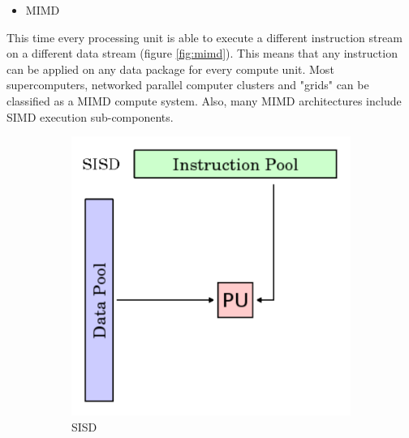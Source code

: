 \documentclass[a4paper, 11pt]{report}
\begin{document}
	\begin{itemize}
		\item MIMD
	\end{itemize}
This time every processing unit is able to execute a different instruction stream on a different data stream (figure \ref{fig:mimd}). This means that any instruction can be applied on any data package for every compute unit. Most supercomputers, networked parallel computer clusters and "grids" can be classified as a MIMD compute system. Also, many MIMD architectures include SIMD execution sub-components.

\begin{figure}[h]
	\centering
	\begin{subfigure}[t]{0.4\textwidth}
		\centering
		\includegraphics[scale=.3]{images/sisd.pdf}
		\caption{SISD}\label{fig:sisd}
	\end{subfigure}
	\begin{subfigure}[t]{0.4\textwidth}
		\centering

\end{subfigure}
\end{figure}
\end{document}
